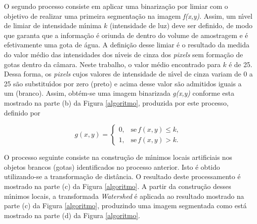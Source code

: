 O segundo processo consiste em aplicar uma binariza\c{c}\~{a}o por limiar com o objetivo de realizar uma primeira segmenta\c{c}\~{a}o na imagem \emph{f(x,y)}. Assim, um n\'{\i}vel de limiar de intensidade m\'{\i}nima $k$ (intensidade de luz) deve ser definido, de modo que garanta que a informa\c{c}\~{a}o \'{e} oriunda de dentro do volume de amostragem e \'{e} efetivamente uma gota de \'{a}gua. A defini\c{c}\~{a}o desse limiar \'{e} o resultado da medida do valor m\'{e}dio das intensidades dos n\'{\i}veis de cinza dos \textit{pixels} sem forma\c{c}\~{a}o de gotas dentro da c\^{a}mara. Neste trabalho, o valor m\'{e}dio encontrado para $k$ \'{e} de 25. Dessa forma, os \textit{pixels} cujos valores de intensidade de n\'{\i}vel de cinza variam de 0 a 25 s\~{a}o substitu\'{\i}dos por zero (preto) e acima desse valor s\~{a}o admitidos iguais a um (branco). Assim, obt\'{e}m-se uma imagem binarizada \textit{g(x,y)} conforme esta mostrado na parte (b) da Figura \ref {algoritmo}, produzida por este processo, definido por


\begin{equation}
 \label{eqgxy}
g(x,y) = \left\{
\begin{array}{ll}
0, & \textrm{se} \, f(x,y) \leq k, \\
1, & \textrm{se} \, f(x,y) > k.
\end{array}
\right.
\end{equation}




 O processo seguinte consiste na constru\c{c}\~{a}o de m\'{\i}nimos locais artificiais nos objetos brancos (gotas) identificados no processo anterior. Isto \'{e} obtido utilizando-se a transforma\c{c}\~{a}o de dist\^{a}ncia. O resultado deste processamento \'{e} mostrado na parte (c) da Figura \ref {algoritmo}. A partir da constru\c{c}\~{a}o desses m\'{\i}nimos locais, a transformada \textit{Watershed} \'{e} aplicada ao resultado mostrado na parte (c) da Figura \ref{algoritmo}, produzindo uma imagem segmentada como est\'{a} mostrado na parte (d) da Figura \ref{algoritmo}.


